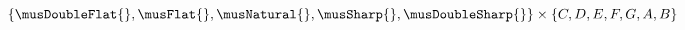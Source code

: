\[
\{\musDoubleFlat{}, \musFlat{}, \musNatural{}, \musSharp{},
\musDoubleSharp{} \}
\times 
\{C, D, E, F, G, A, B \}
\]
